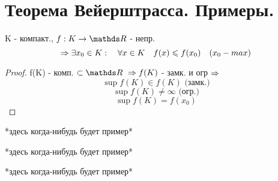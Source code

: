 \documentclass[geometry.tex]{subfiles}
\begin{document}
  \section{Теорема Вейерштрасса. Примеры.}

  \begin{theorem} [Вейерштрасса]
      K - компакт., $f: K \rightarrow \R $ - непр.
      \[\Rightarrow \exists x_0 \in K: \quad \forall x \in K \quad f(x) \leqslant f(x_0) \quad (x_0 - max)\]
  \end{theorem}

  \begin{proof}
      f(K) - комп. $\subset \R \  \Ra f(K)$ - замк. и огр $\Rightarrow$
      \[\sup{f(K)} \in f(K)\text{ (замк.)}\]
      \[\sup{f(K)} \neq \infty\text{ (огр.)}\]
      \[\sup{f(K)} = f(x_0)\]
  \end{proof}

  \begin{example}
      *здесь когда-нибудь будет пример*
  \end{example}

  \begin{example}[искусственный]
      *здесь когда-нибудь будет пример*
  \end{example}

  \begin{example}
      *здесь когда-нибудь будет пример*
  \end{example}
\end{document}
